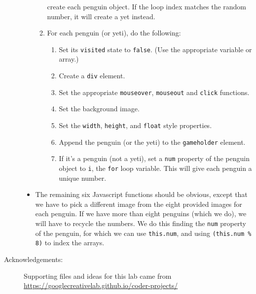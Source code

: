 \documentclass{article}
\begin{document}
\begin{description}
\begin{itemize}
\begin{enumerate}
        create each penguin object.  If the loop index matches the random
        number, it will create a yet instead.
      \item For each penguin (or yeti), do the following:
        \begin{enumerate}
        \item Set its {\tt visited} state to {\tt false}.  (Use the
          appropriate variable or array.)
        \item Create a {\tt div} element.
        \item Set the  appropriate {\tt mouseover}, {\tt mouseout}
          and {\tt click} functions.
        \item Set the background image.
        \item Set the {\tt width}, {\tt height}, and {\tt float} style
          properties.
        \item Append the penguin (or the yeti) to the {\tt gameholder}
          element.
        \item If it's a penguin (not a yeti), set a {\tt num}
          property of the penguin object to {\tt i}, the {\tt for}
          loop variable.  This will give each penguin a unique number.
        \end{enumerate}
      \end{enumerate}
    \item The remaining six Javascript functions should be obvious,
      except that we have to pick a different image from the eight
      provided images for each penguin.  If we have more than eight
      penguins (which we do), we will have to recycle the numbers.  We
      do this finding the {\tt num} property of the penguin, for which
      we can use {\tt this.num}, and using
      \verb|(this.num % 8)| to index the arrays.
  \end{itemize}
  


\item[Acknowledgements:] Supporting files and ideas for this lab came
  from\\ \url{https://googlecreativelab.github.io/coder-projects/}


\end{description}
\end{document}
